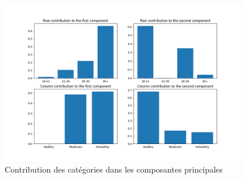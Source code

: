 \begin{figure}[!h]
  \begin{center}
    \includegraphics[width=0.95\textwidth]{Images/Age_Dietary_all/RowColumnsContributions.png}
  \end{center}
  \caption{Contribution des catégories dans les composantes principales}
  \label{fig:contribAgeDietary}
\end{figure}


